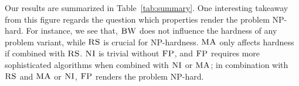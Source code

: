\documentclass[conference,10pt]{IEEEtran}
\newcommand{\maciek}[1]{\textcolor{brown}{maciek: #1}}
\newcommand{\CC}{\textsc{NI}}
\newcommand{\FP}{\textsc{FP}}
\newcommand{\RS}{\textsc{RS}}
\newcommand{\BW}{\textsc{BW}}
\newcommand{\MA}{\textsc{MA}}
\begin{document}
Our results are summarized in
Table~\ref{tab:summary}.
One interesting takeaway from this figure regards
the question which properties render the problem
NP-hard. For instance, we see that, $\BW$
does not influence the hardness of any problem variant,
while $\RS$ is crucial for NP-hardness.
$\MA$ only affects hardness if combined with $\RS$.
$\CC$ is trivial without $\FP$, and $\FP$ requires
more sophisticated algorithms when combined with $\CC$ or $\MA$;
in combination with $\RS$ and $\MA$ or $\CC$, $\FP$ renders the
problem NP-hard.





{\footnotesize \renewcommand{\baselinestretch}{.9}


}
\end{document}
